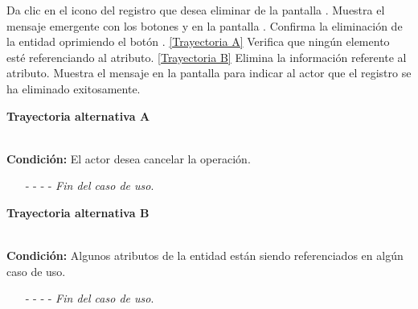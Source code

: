 	\begin{UCtrayectoria}
		\UCpaso[\UCactor] Da clic en el icono \eliminar del registro que desea eliminar de la pantalla .
		\UCpaso[\UCsist] Muestra el mensaje emergente  con los botones  y  en la pantalla .
		\UCpaso[\UCactor] Confirma la eliminación de la entidad oprimiendo el botón . \hyperlink{CU7-1-1-3:TAA}{[Trayectoria A]}
		\UCpaso[\UCsist] Verifica que ningún elemento esté referenciando al atributo. \hyperlink{CU7-1-1-3:TAB}{[Trayectoria B]}
		\UCpaso[\UCsist] Elimina la información referente al atributo.
		\UCpaso[\UCsist] Muestra el mensaje  en la pantalla  para indicar al actor que el registro se ha eliminado exitosamente.
	\end{UCtrayectoria}	
	\hypertarget{CU7-1-1-3:TAA}{\textbf{Trayectoria alternativa A}}\\
	\noindent \textbf{Condición:} El actor desea cancelar la operación.
	\begin{enumerate}
		\UCpaso[\UCactor] Oprime el botón  de la pantalla emergente.
		\UCpaso[\UCsist] Muestra la pantalla .
		\item[- -] - - {\em {Fin del caso de uso}}.%
	\end{enumerate}

	\hypertarget{CU7-1-1-3:TAB}{\textbf{Trayectoria alternativa B}}\\
	\noindent \textbf{Condición:} Algunos atributos de la entidad están siendo referenciados en algún caso de uso.
	\begin{enumerate}
		\UCpaso[\UCsist] Muestra el mensaje  en la pantalla .
		\item[- -] - - {\em {Fin del caso de uso}}.
	\end{enumerate}
